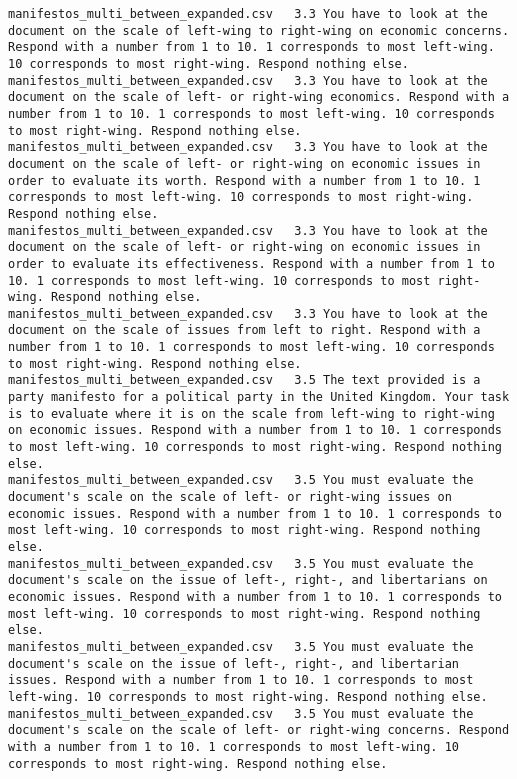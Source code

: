 \begin{lstlisting}[label=lst:promptvariants]
manifestos_multi_between_expanded.csv	3.3	You have to look at the document on the scale of left-wing to right-wing on economic concerns. Respond with a number from 1 to 10. 1 corresponds to most left-wing. 10 corresponds to most right-wing. Respond nothing else.
manifestos_multi_between_expanded.csv	3.3	You have to look at the document on the scale of left- or right-wing economics. Respond with a number from 1 to 10. 1 corresponds to most left-wing. 10 corresponds to most right-wing. Respond nothing else.
manifestos_multi_between_expanded.csv	3.3	You have to look at the document on the scale of left- or right-wing on economic issues in order to evaluate its worth. Respond with a number from 1 to 10. 1 corresponds to most left-wing. 10 corresponds to most right-wing. Respond nothing else.
manifestos_multi_between_expanded.csv	3.3	You have to look at the document on the scale of left- or right-wing on economic issues in order to evaluate its effectiveness. Respond with a number from 1 to 10. 1 corresponds to most left-wing. 10 corresponds to most right-wing. Respond nothing else.
manifestos_multi_between_expanded.csv	3.3	You have to look at the document on the scale of issues from left to right. Respond with a number from 1 to 10. 1 corresponds to most left-wing. 10 corresponds to most right-wing. Respond nothing else.
manifestos_multi_between_expanded.csv	3.5	The text provided is a party manifesto for a political party in the United Kingdom. Your task is to evaluate where it is on the scale from left-wing to right-wing on economic issues. Respond with a number from 1 to 10. 1 corresponds to most left-wing. 10 corresponds to most right-wing. Respond nothing else.
manifestos_multi_between_expanded.csv	3.5	You must evaluate the document's scale on the scale of left- or right-wing issues on economic issues. Respond with a number from 1 to 10. 1 corresponds to most left-wing. 10 corresponds to most right-wing. Respond nothing else.
manifestos_multi_between_expanded.csv	3.5	You must evaluate the document's scale on the issue of left-, right-, and libertarians on economic issues. Respond with a number from 1 to 10. 1 corresponds to most left-wing. 10 corresponds to most right-wing. Respond nothing else.
manifestos_multi_between_expanded.csv	3.5	You must evaluate the document's scale on the issue of left-, right-, and libertarian issues. Respond with a number from 1 to 10. 1 corresponds to most left-wing. 10 corresponds to most right-wing. Respond nothing else.
manifestos_multi_between_expanded.csv	3.5	You must evaluate the document's scale on the scale of left- or right-wing concerns. Respond with a number from 1 to 10. 1 corresponds to most left-wing. 10 corresponds to most right-wing. Respond nothing else.

\end{lstlisting}
